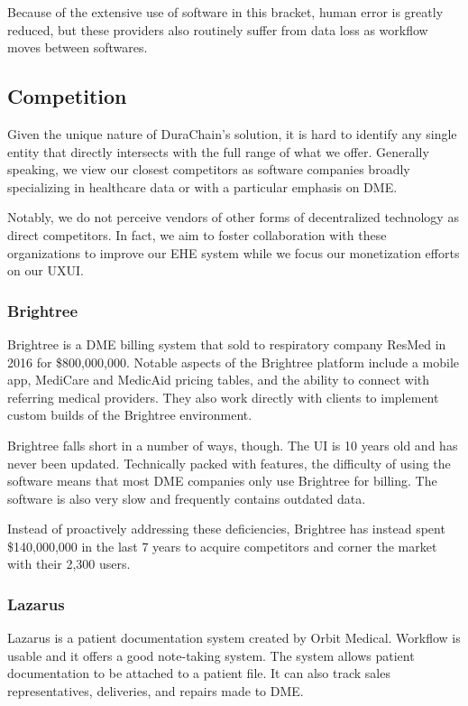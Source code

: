   Because of the extensive use of software in this bracket, human error is greatly reduced, but these providers also routinely suffer from data loss as workflow moves between softwares.%

\subsection{Competition}
Given the unique nature of DuraChain's solution, it is hard to identify any single entity that directly intersects with the full range of what we offer. Generally speaking, we view our closest competitors as software companies broadly specializing in healthcare data or with a particular emphasis on DME.%

Notably, we do not perceive vendors of other forms of decentralized technology as direct competitors. In fact, we aim to foster collaboration with these organizations to improve our EHE system while we focus our monetization efforts on our UXUI.%

  \subsubsection{Brightree}
  Brightree is a DME billing system that sold to respiratory company ResMed in 2016 for \$800,000,000. Notable aspects of the Brightree platform include a mobile app, MediCare and MedicAid pricing tables, and the ability to connect with referring medical providers. They also work directly with clients to implement custom builds of the Brightree environment.%

  Brightree falls short in a number of ways, though. The UI is 10 years old and has never been updated. Technically packed with features, the difficulty of using the software means that most DME companies only use Brightree for billing. The software is also very slow and frequently contains outdated data.%

  Instead of proactively addressing these deficiencies, Brightree has instead spent \$140,000,000 in the last 7 years to acquire competitors and corner the market with their 2,300 users.%

  \subsubsection{Lazarus}
  Lazarus is a patient documentation system created by Orbit Medical. Workflow is usable and it offers a good note-taking system. The system allows patient documentation to be attached to a patient file. It can also track sales representatives, deliveries, and repairs made to DME.%

